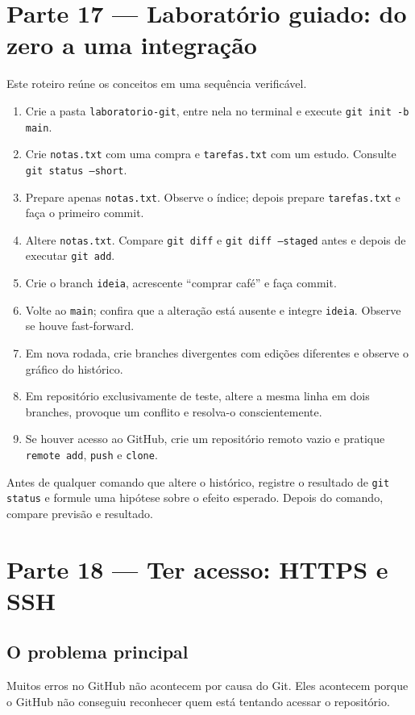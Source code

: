 \documentclass[11pt,a4paper]{article}
\begin{document}
\section*{Parte 17 --- Laboratório guiado: do zero a uma integração}
Este roteiro reúne os conceitos em uma sequência verificável.
\begin{enumerate}
\item Crie a pasta \texttt{laboratorio-git}, entre nela no terminal e execute \texttt{git init -b main}.
\item Crie \texttt{notas.txt} com uma compra e \texttt{tarefas.txt} com um estudo. Consulte \texttt{git status --short}.
\item Prepare apenas \texttt{notas.txt}. Observe o índice; depois prepare \texttt{tarefas.txt} e faça o primeiro commit.
\item Altere \texttt{notas.txt}. Compare \texttt{git diff} e \texttt{git diff --staged} antes e depois de executar \texttt{git add}.
\item Crie o branch \texttt{ideia}, acrescente ``comprar café'' e faça commit.
\item Volte ao \texttt{main}; confira que a alteração está ausente e integre \texttt{ideia}. Observe se houve fast-forward.
\item Em nova rodada, crie branches divergentes com edições diferentes e observe o gráfico do histórico.
\item Em repositório exclusivamente de teste, altere a mesma linha em dois branches, provoque um conflito e resolva-o conscientemente.
\item Se houver acesso ao GitHub, crie um repositório remoto vazio e pratique \texttt{remote add}, \texttt{push} e \texttt{clone}.
\end{enumerate}
\begin{tcolorbox}[title={RECOMENDAÇÃO PARA A AULA}]
Antes de qualquer comando que altere o histórico, registre o resultado de \texttt{git status} e formule uma hipótese sobre o efeito esperado. Depois do comando, compare previsão e resultado.
\end{tcolorbox}

\section*{Parte 18 --- Ter acesso: HTTPS e SSH}
\subsection*{O problema principal}
Muitos erros no GitHub não acontecem por causa do Git. Eles acontecem porque o GitHub não conseguiu reconhecer quem está tentando acessar o repositório.
\end{document}
